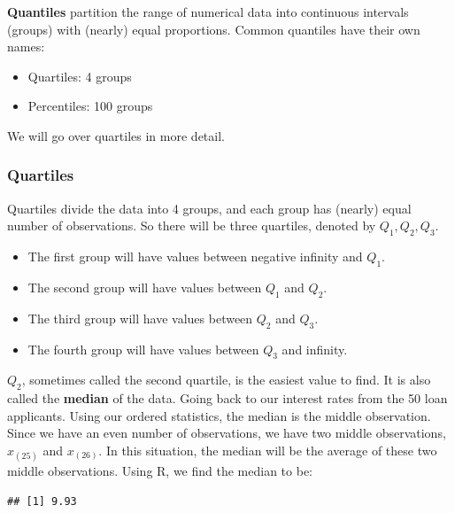 \documentclass[
]{book}
\newenvironment{Shaded}{\begin{snugshade}}{\end{snugshade}}
\newcommand{\FunctionTok}[1]{\textcolor[rgb]{0.13,0.29,0.53}{\textbf{#1}}}
\newcommand{\NormalTok}[1]{#1}
\newcommand{\SpecialCharTok}[1]{\textcolor[rgb]{0.81,0.36,0.00}{\textbf{#1}}}
\providecommand{\tightlist}{%
  \setlength{\itemsep}{0pt}\setlength{\parskip}{0pt}}
\begin{document}
\textbf{Quantiles} partition the range of numerical data into continuous intervals (groups) with (nearly) equal proportions. Common quantiles have their own names:

\begin{itemize}
\tightlist
\item
  Quartiles: 4 groups
\item
  Percentiles: 100 groups
\end{itemize}

We will go over quartiles in more detail.

\hypertarget{quart}{%
\subsubsection{Quartiles}\label{quart}}

Quartiles divide the data into 4 groups, and each group has (nearly) equal number of observations. So there will be three quartiles, denoted by \(Q_1, Q_2, Q_3\).

\begin{itemize}
\tightlist
\item
  The first group will have values between negative infinity and \(Q_1\).
\item
  The second group will have values between \(Q_1\) and \(Q_2\).
\item
  The third group will have values between \(Q_2\) and \(Q_3\).
\item
  The fourth group will have values between \(Q_3\) and infinity.
\end{itemize}

\(Q_2\), sometimes called the second quartile, is the easiest value to find. It is also called the \textbf{median} of the data. Going back to our interest rates from the 50 loan applicants. Using our ordered statistics, the median is the middle observation. Since we have an even number of observations, we have two middle observations, \(x_{(25)}\) and \(x_{(26)}\). In this situation, the median will be the average of these two middle observations. Using R, we find the median to be:

\begin{Shaded}
\end{Shaded}

\begin{verbatim}
## [1] 9.93
\end{verbatim}
\end{document}
